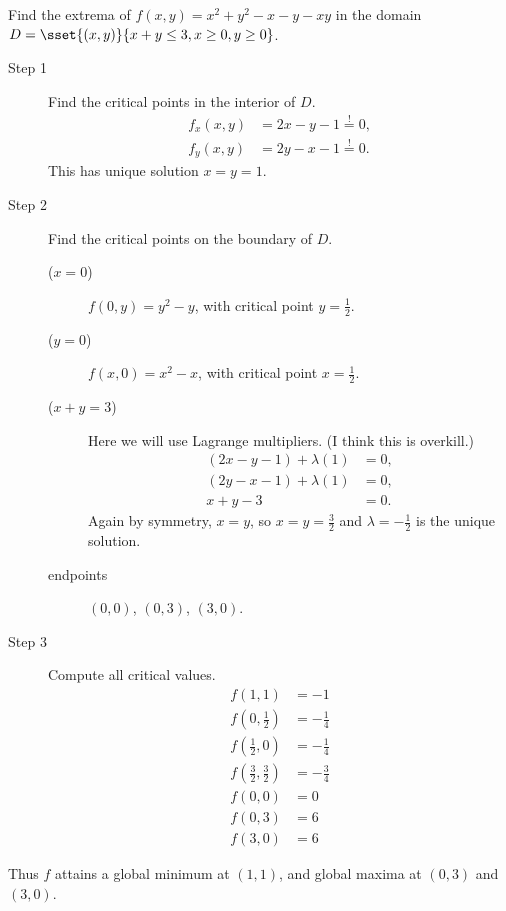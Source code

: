 \begin{example}
    Find the extrema of $f(x, y) = x^2 + y^2 - x - y - xy$ in the domain
    $D = \sset{(x, y)}{x + y \le 3, x \ge 0, y \ge 0}$.
    \begin{description}
        \item[Step 1] Find the critical points in the interior of $D$.
        \begin{align*}
            f_x(x, y) &= 2x - y - 1 \overset{!}{=} 0, \\
            f_y(x, y) &= 2y - x - 1 \overset{!}{=} 0.
        \end{align*}
        This has unique solution $x = y = 1$.
        \item[Step 2] Find the critical points on the boundary of $D$.
        \begin{description}
            \item[($x = 0$)] $f(0, y) = y^2 - y$, with critical point
            $y = \frac12$.
            \item[($y = 0$)] $f(x, 0) = x^2 - x$, with critical point
            $x = \frac12$.
            \item[($x + y = 3$)] Here we will use Lagrange multipliers.
            (I think this is overkill.)
            \begin{align*}
                (2x - y - 1) + \lambda(1) &= 0, \\
                (2y - x - 1) + \lambda(1) &= 0, \\
                x + y - 3 &= 0.
            \end{align*}
            Again by symmetry, $x = y$, so $x = y = \frac 32$ and
            $\lambda = -\frac12$ is the unique solution.
            \item[endpoints] $(0, 0)$, $(0, 3)$, $(3, 0)$.
        \end{description}
        \item[Step 3] Compute all critical values.
        \begin{align*}
            f(1, 1) &= -1 \\
            f(0, \frac12) &= -\frac14 \\
            f(\frac12, 0) &= -\frac14 \\
            f(\frac32, \frac32) &= -\frac 34 \\
            f(0, 0) &= 0 \\
            f(0, 3) &= 6 \\
            f(3, 0) &= 6
        \end{align*}
    \end{description}
    Thus $f$ attains a global minimum at $(1, 1)$, and global maxima at
    $(0, 3)$ and $(3, 0)$.
\end{example}

